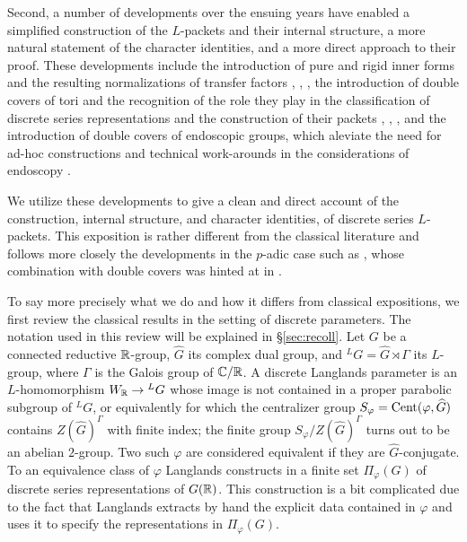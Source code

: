\documentclass{article}
\theoremstyle{definition}
\numberwithin{equation}{section}
\renewcommand{\-}{\hyp{}}
\begin{document}
Second, a number of developments over the ensuing years have enabled a simplified construction of the $L$\-packets and their internal structure, a more natural statement of the character identities, and a more direct approach to their proof. These developments include the introduction of pure and rigid inner forms and the resulting normalizations of transfer factors \cite{Vog93}, \cite{KalECI}, \cite{KalRI}, the introduction of double covers of tori and the recognition of the role they play in the classification of discrete series representations and the construction of their packets \cite{AV92}, \cite{AV16}, \cite{KalDC}, and the introduction of double covers of endoscopic groups, which aleviate the need for ad-hoc constructions and technical work-arounds in the considerations of endoscopy \cite{KalHDC}. 

We utilize these developments to give a clean and direct account of the construction, internal structure, and character identities, of discrete series $L$\-packets. This exposition is rather different from the classical literature and follows more closely the developments in the $p$-adic case such as \cite{KalRSP}, whose combination with double covers was hinted at in \cite{KalDC}.

To say more precisely what we do and how it differs from classical expositions, we first review the classical results in the setting of discrete parameters. The notation used in this review will be explained in \S\ref{sec:recoll}. Let $G$ be a connected reductive $\mathbb{R}$-group, $\hat G$ its complex dual group, and $^LG=\hat G \rtimes \Gamma$ its $L$\-group, where $\Gamma$ is the Galois group of $\mathbb{C}/\mathbb{R}$. A discrete Langlands parameter is an $L$\-homomorphism $W_{\mathbb{R}} \to {^LG}$ whose image is not contained in a proper parabolic subgroup of $^LG$, or equivalently for which the centralizer group $S_\varphi=\textrm{Cent}(\varphi,\widehat G)$ contains $Z(\hat G)^\Gamma$ with finite index; the finite group $S_\varphi/Z(\hat G)^\Gamma$ turns out to be an abelian $2$-group. Two such $\varphi$ are considered equivalent if they are $\hat G$-conjugate. To an equivalence class of $\varphi$ Langlands constructs in \cite[\S3]{Lan89} a finite set $\Pi_\varphi(G)$ of discrete series representations of $G(\mathbb{R})$. This construction is a bit complicated due to the fact that Langlands extracts by hand the explicit data contained in $\varphi$ and uses it to specify the representations in $\Pi_\varphi(G)$.
\end{document}
